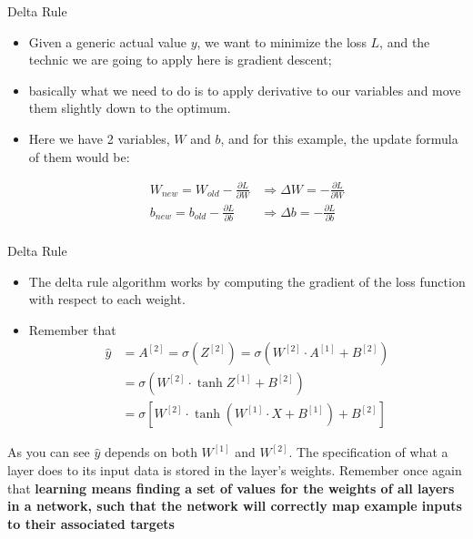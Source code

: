\documentclass[11pt]{beamer}
\begin{document}
\begin{frame}{Delta Rule}
\begin{itemize}
\item Given a generic actual value $y$, we want to minimize the loss $L$, and the technic we are going to apply here is gradient descent; 
\item basically what we need to do is to apply derivative to our variables and move them slightly down to the optimum. 
\item Here we have 2 variables, $W$ and $b$, and for this example, the update formula of them would be:

\begin{align*}
W_{new} = W_{old} - \frac{\partial L}{\partial W} &\Rightarrow \Delta W = - \frac{\partial L}{\partial W} \\
b_{new} = b_{old} - \frac{\partial L}{\partial b} &\Rightarrow \Delta b = - \frac{\partial L}{\partial b} \\
\end{align*}

\end{itemize}
\end{frame}
\begin{frame}{Delta Rule}
\begin{itemize}
\item The delta rule algorithm works by computing the gradient of the loss function with respect to each weight. 
\item Remember that
\begin{align*}
\hat y &= A^{[2]} = \sigma\left(Z^{[2]}\right) = \sigma \left( W^{[2]} \cdot A^{[1]} + B^{[2]} \right) \\
&= \sigma \left( W^{[2]} \cdot \tanh{Z^{[1]}} + B^{[2]} \right) \\
&= \sigma \left[ W^{[2]} \cdot \tanh\left( W^{[1]} \cdot X + B^{[1]} \right) + B^{[2]} \right]
\end{align*}
\end{itemize}
\begin{tcolorbox}
As you can see $\hat y$ depends on both $W^{[1]}$ and $W^{[2]}$. The specification of what a layer does to its input data is stored in the layer's weights. Remember once again that \textbf{learning means finding a set of values for the weights of all layers in a network, such that the network will correctly map example inputs to their associated targets} 
\end{tcolorbox}
\end{frame}
\end{document}
